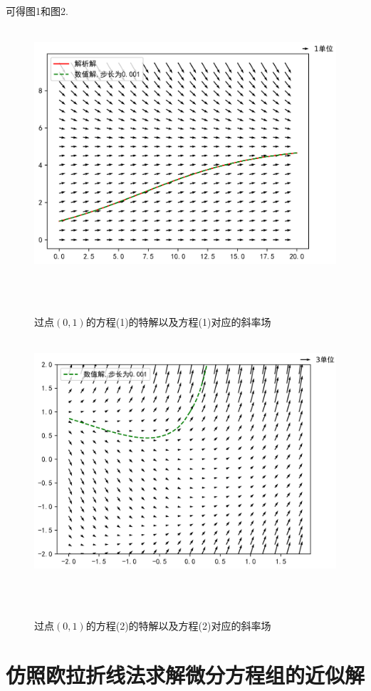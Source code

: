 \documentclass[a4paper]{article}%
\begin{document}
可得图1和图2.
\begin{figure}[h]
        \centering
        \includegraphics[scale=0.65]{1}
        \caption[图一]{过点$(0,1)$的方程(1)的特解以及方程(1)对应的斜率场}
        \end{figure}
\begin{figure}[H]
        \centering
        \includegraphics[scale=0.65]{2}
        \caption[图一]{过点$(0,1)$的方程(2)的特解以及方程(2)对应的斜率场}
        \end{figure}
\section{仿照欧拉折线法求解微分方程组的近似解}
\end{document}
